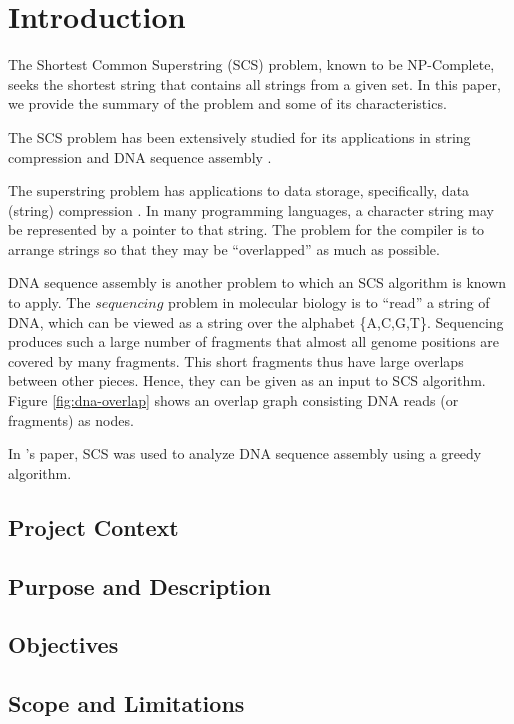 \chapter{Introduction}


The Shortest Common Superstring (SCS) problem, known to be NP-Complete,
seeks the shortest string that contains all strings from a given set.
In this paper, we provide the summary of the problem and some of its characteristics.

The SCS problem has been extensively studied for its
applications in string compression and DNA sequence assembly \cite{Ma2009}.

The superstring problem has applications to data storage,
 specifically, data (string) compression \cite{Gallant1980}. 
In many programming languages, a character string may be 
represented by a pointer to that string. 
The problem for the compiler is to arrange strings 
so that they may be ``overlapped'' as much as possible.

DNA sequence assembly is another  problem to which an SCS algorithm is known to apply.
The $sequencing$ problem in molecular biology is to ``read'' a string of DNA,
which can be viewed as a string over the alphabet \{A,C,G,T\}. Sequencing produces such a large number of fragments that
almost all genome positions are covered by many fragments. This short fragments
thus have large overlaps between other pieces. Hence, they can be given as an input to SCS algorithm.
Figure \ref{fig:dna-overlap} shows an overlap graph consisting DNA reads (or fragments) as nodes. 



\begin{figure*}
\centering
{}
\caption{Sample overlap graph with each adjacent nodes 
having at least $k = 3$ overlaps. The original string is \texttt{GCATTATATATTGCGCGTACGGCGCCGCTACA}.}
\label{fig:dna-overlap}
\end{figure*}	

In \cite{Ma2009}'s paper, SCS was used to analyze DNA sequence assembly using
a greedy algorithm. 

\section{Project Context}

\section{Purpose and Description}

\section{Objectives}

\vfill\eject
\section{Scope and Limitations}

